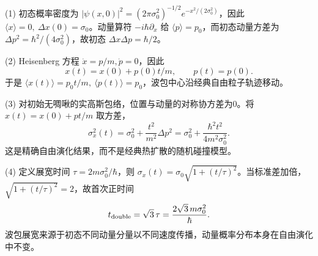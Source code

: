 (1) 初态概率密度为 \(|\psi(x,0)|^2=(2\pi\sigma_0^2)^{-1/2}e^{-x^2/(2\sigma_0^2)}\)，因此 \(\langle x\rangle=0,\ \Delta x(0)=\sigma_0\)。动量算符 \(-i\hbar\partial_x\) 给 \(\langle p\rangle=p_0\)，而初态动量方差为 \(\Delta p^2=\hbar^2/(4\sigma_0^2)\)，故初态 \(\Delta x\Delta p=\hbar/2\)。

(2) Heisenberg 方程 \(\dot x=p/m,\dot p=0\)，因此
\[
x(t)=x(0)+p(0)t/m,\qquad p(t)=p(0).
\]
于是 \(\langle x(t)\rangle=p_0t/m,\ \langle p(t)\rangle=p_0\)，波包中心沿经典自由粒子轨迹移动。

(3) 对初始无啁啾的实高斯包络，位置与动量的对称协方差为0。将 \(x(t)=x(0)+pt/m\) 取方差，
\[
\sigma_x^2(t)=\sigma_0^2+\frac{t^2}{m^2}\Delta p^2
=\sigma_0^2+\frac{\hbar^2t^2}{4m^2\sigma_0^2}.
\]
这是精确自由演化结果，而不是经典热扩散的随机碰撞模型。

(4) 定义展宽时间 \(\tau=2m\sigma_0^2/\hbar\)，则 \(\sigma_x(t)=\sigma_0\sqrt{1+(t/\tau)^2}\)。当标准差加倍，\(\sqrt{1+(t/\tau)^2}=2\)，故首次正时间
\[
t_{\rm double}=\sqrt3\,\tau=\frac{2\sqrt3\,m\sigma_0^2}{\hbar}.
\]
波包展宽来源于初态不同动量分量以不同速度传播，动量概率分布本身在自由演化中不变。
